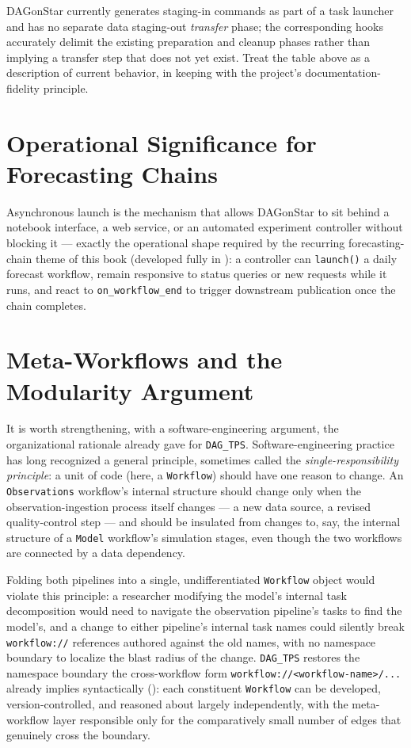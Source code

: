 \begin{practicebox}
DAGonStar currently generates staging-in commands as part of a task
launcher and has no separate data staging-out \emph{transfer} phase; the
corresponding hooks accurately delimit the existing preparation and cleanup
phases rather than implying a transfer step that does not yet exist. Treat
the table above as a description of current behavior, in keeping with the
project's documentation-fidelity principle.
\end{practicebox}

\section{Operational Significance for Forecasting Chains}

Asynchronous launch is the mechanism that allows DAGonStar to sit behind a
notebook interface, a web service, or an automated experiment controller
without blocking it --- exactly the operational shape required by the
recurring forecasting-chain theme of this book (developed fully in
): a controller can \texttt{launch()} a
daily forecast workflow, remain responsive to status queries or new requests
while it runs, and react to \texttt{on\_workflow\_end} to trigger
downstream publication once the chain completes.

\section{Meta-Workflows and the Modularity Argument}

It is worth strengthening, with a software-engineering argument, the
organizational rationale  already gave for
\texttt{DAG\_TPS}. Software-engineering practice has long recognized a
general principle, sometimes called the \emph{single-responsibility
principle}: a unit of code (here, a \texttt{Workflow}) should have one
reason to change. An \texttt{Observations} workflow's internal structure
should change only when the observation-ingestion process itself changes
--- a new data source, a revised quality-control step --- and should be
insulated from changes to, say, the internal structure of a \texttt{Model}
workflow's simulation stages, even though the two workflows are connected
by a data dependency.

Folding both pipelines into a single, undifferentiated \texttt{Workflow}
object would violate this principle: a researcher modifying the model's
internal task decomposition would need to navigate the observation
pipeline's tasks to find the model's, and a change to either pipeline's
internal task names could silently break \texttt{workflow://} references
authored against the old names, with no namespace boundary to localize the
blast radius of the change. \texttt{DAG\_TPS} restores the namespace
boundary the cross-workflow form \texttt{workflow://<workflow-name>/...}
already implies syntactically (): each constituent
\texttt{Workflow} can be developed, version-controlled, and reasoned about
largely independently, with the meta-workflow layer responsible only for
the comparatively small number of edges that genuinely cross the boundary.

